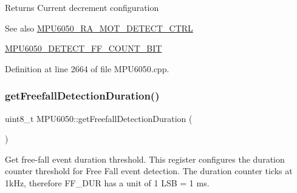 \begin{DoxyReturn}{Returns}
Current decrement configuration 
\end{DoxyReturn}
\begin{DoxySeeAlso}{See also}
\mbox{\hyperlink{MPU6050_8h_ae83e3eb48f0803227db54291fdf0ea80}{M\+P\+U6050\+\_\+\+R\+A\+\_\+\+M\+O\+T\+\_\+\+D\+E\+T\+E\+C\+T\+\_\+\+C\+T\+RL}} 

\mbox{\hyperlink{MPU6050_8h_a77e346aef05647d9d492077e0297d67b}{M\+P\+U6050\+\_\+\+D\+E\+T\+E\+C\+T\+\_\+\+F\+F\+\_\+\+C\+O\+U\+N\+T\+\_\+\+B\+IT}} 
\end{DoxySeeAlso}


Definition at line 2664 of file M\+P\+U6050.\+cpp.


\begin{DoxyCode}{0}

\end{DoxyCode}
\mbox{\label{classMPU6050_a3cff6b9613ad01aa1a51c287f5c5e329}} 
\subsubsection{\texorpdfstring{getFreefallDetectionDuration()}{getFreefallDetectionDuration()}}
{\footnotesize\ttfamily uint8\+\_\+t M\+P\+U6050\+::get\+Freefall\+Detection\+Duration (\begin{DoxyParamCaption}{ }\end{DoxyParamCaption})}

Get free-\/fall event duration threshold. This register configures the duration counter threshold for Free Fall event detection. The duration counter ticks at 1k\+Hz, therefore F\+F\+\_\+\+D\+UR has a unit of 1 L\+SB = 1 ms.

